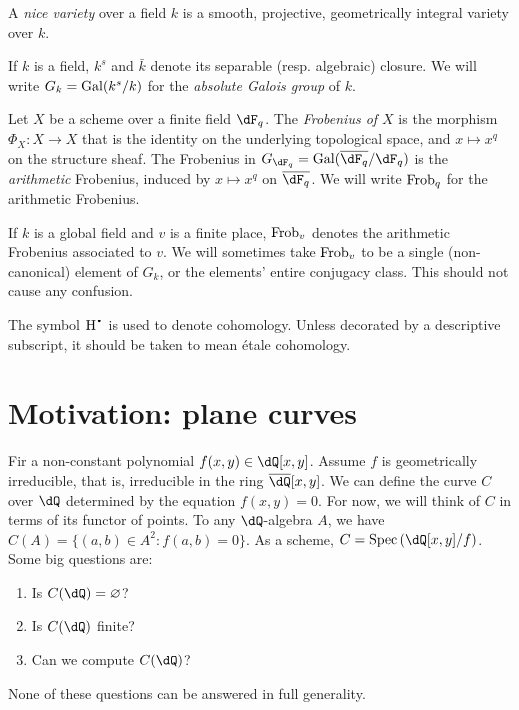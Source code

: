 \documentclass{article}
\begin{document}
A \emph{nice variety} over a field $k$ is a smooth, projective, geometrically 
integral variety over $k$. 

If $k$ is a field, $k^s$ and $\bar k$ denote its separable (resp. algebraic) 
closure. We will write $G_k = \operatorname{Gal}(k^s/k)$ for the \emph{absolute Galois group} 
of $k$. 


Let $X$ be a scheme over a finite field $\dF_q$. The \emph{Frobenius of $X$} 
is the morphism $\Phi_X:X\to X$ that is the identity on the underlying 
topological space, and $x\mapsto x^q$ on the structure sheaf. The Frobenius in 
$G_{\dF_q} = \gal(\overline{\dF_q}/\dF_q)$ is the \emph{arithmetic} Frobenius, 
induced by $x\mapsto x^q$ on $\overline{\dF_q}$. We will write $\mathrm{Frob}_q$ for 
the arithmetic Frobenius. 

If $k$ is a global field and $v$ is a finite place, $\mathrm{Frob}_v$ denotes the 
arithmetic Frobenius associated to $v$. We will sometimes take $\mathrm{Frob}_v$ to be 
a single (non-canonical) element of $G_k$, or the elements' entire conjugacy 
class. This should not cause any confusion. 

The symbol $\h^\bullet{}$ is used to denote cohomology. Unless decorated by a 
descriptive subscript, it should be taken to mean \'etale cohomology. 










\section*{Motivation: plane curves}





Fir a non-constant polynomial $f(x,y)\in\dQ[x,y]$. Assume $f$ is 
geometrically irreducible, that is, irreducible in the ring 
$\overline{\dQ}[x,y]$. We can define the curve $C$ over $\dQ$ determined by the 
equation $f(x,y)=0$. For now, we will think of $C$ in terms of its functor of 
points. To any $\dQ$-algebra $A$, we have $C(A)=\{(a,b)\in A^2:f(a,b)=0\}$. 
As a scheme, $C=\spec\left(\dQ[x,y]/f\right)$. Some big questions are:
\begin{enumerate}
  \item Is $C(\dQ)=\varnothing$?
  \item Is $C(\dQ)$ finite?
  \item Can we compute $C(\dQ)$?
\end{enumerate}
None of these questions can be answered in full generality. 
\end{document}
